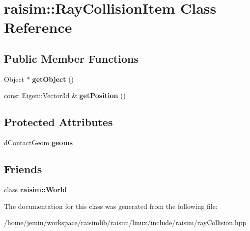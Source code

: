 \hypertarget{classraisim_1_1RayCollisionItem}{}\section{raisim\+:\+:Ray\+Collision\+Item Class Reference}
\label{classraisim_1_1RayCollisionItem}
\subsection*{Public Member Functions}
\begin{DoxyCompactItemize}
\item 
\mbox{\label{classraisim_1_1RayCollisionItem_abf96d25db46a0a5eed78b5fa3023230c}} 
Object $\ast$ {\bfseries get\+Object} ()
\item 
\mbox{\label{classraisim_1_1RayCollisionItem_ace552538253d5d8b5f1e12011adfd790}} 
const Eigen\+::\+Vector3d \& {\bfseries get\+Position} ()
\end{DoxyCompactItemize}
\subsection*{Protected Attributes}
\begin{DoxyCompactItemize}
\item 
\mbox{\label{classraisim_1_1RayCollisionItem_a40449b8cdcbeb0351989ad44c9697d4e}} 
d\+Contact\+Geom {\bfseries geoms}
\end{DoxyCompactItemize}
\subsection*{Friends}
\begin{DoxyCompactItemize}
\item 
\mbox{\label{classraisim_1_1RayCollisionItem_a75377ff6a84c306b270e189091d3efed}} 
class {\bfseries raisim\+::\+World}
\end{DoxyCompactItemize}


The documentation for this class was generated from the following file\+:\begin{DoxyCompactItemize}
\item 
/home/jemin/workspace/raisimlib/raisim/linux/include/raisim/ray\+Collision.\+hpp\end{DoxyCompactItemize}
